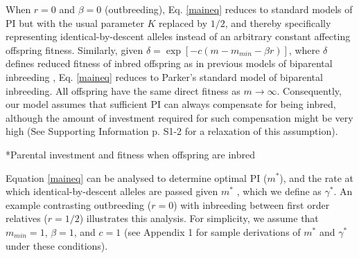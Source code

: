 \documentclass[12pt]{article}
\makeatletter
\renewcommand\subsection{\@startsection{subsection}{1}{-0.25in}{-0.5\baselineskip}{0.1\baselineskip}{\normalfont\normalsize\bfseries\textit}}
\makeatother
\begin{document}
When $r=0$ and $\beta=0$ (outbreeding), Eq. \ref{maineq} reduces to standard models of PI \cite[e.g.,][]{Macnair1978, Parker1978} but with the usual parameter $K$ replaced by $1/2$, and thereby specifically representing identical-by-descent alleles instead of an arbitrary constant affecting offspring fitness. Similarly, given $\delta = \exp\left[-c\left(m-m_{min}-\beta r\right)\right]$, where $\delta$ defines reduced fitness of inbred offspring as in previous models of biparental inbreeding \cite[][]{Kokko2006, Parker2006, Duthie2015a}, Eq. \ref{maineq} reduces to Parker's \citeyearpar{Parker1979} standard model of biparental inbreeding.  All offspring have the same direct fitness as $m \to \infty$. Consequently, our model assumes that sufficient PI can always compensate for being inbred, although the amount of investment required for such compensation might be very high (See Supporting Information p. S1-2 for a relaxation of this assumption).


\subsection*{Parental investment and fitness when offspring are inbred}

Equation \ref{maineq} can be analysed to determine optimal PI ($m^{*}$), and the rate at which identical-by-descent alleles are passed given $m^{*}$ \cite[][]{Kuijper2012}, which we define as $\gamma^{*}$. An example contrasting outbreeding ($r=0$) with inbreeding between first order relatives ($r=1/2$) illustrates this analysis. For simplicity, we assume that $m_{min}=1$, $\beta=1$, and $c=1$ (see Appendix 1 for sample derivations of $m^{*}$ and $\gamma^{*}$ under these conditions).
\end{document}
